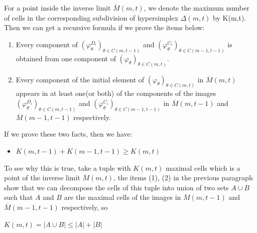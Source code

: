 \documentclass[12pt, reqno]{amsart}
\newtheorem{lemma}[theorem]{Lemma}
\theoremstyle{definition}
\theoremstyle{remark}
\numberwithin{equation}{section}
\begin{document}
  
  
  For 
  a  point inside the  inverse limit
  $\overline{M}(m,t)$,
   we denote the
  maximum number of cells in the corresponding  subdivision of hypersimplex
  $\Delta(m,t)$ by K(m,t). Then we can get a recursive formula if we prove the items below:
  
 
  \begin{enumerate}
  	\item 
  	Every component of 
  	 $(\varphi_{\theta}^{D_i})_{\theta\in C(m,t-1)}$
  	and
  	$(\varphi_{\theta}^{C_i})_{\theta\in C(m-1,t-1)}$ is obtained from one component of 
  	 $(\varphi_{\theta})_{\theta \in C(m,t)}$.
  	

  	\item 
  		Every  component of the 
  		initial element of
  		$(\varphi_{\theta})_{\theta \in C(m,t)}$
  		in $\overline{M}(m,t)$ appears in at least one(or both) of the components of the images
  		$(\varphi_{\theta}^{D_i})_{\theta\in C(m,t-1)}$
  		and
  		$(\varphi_{\theta}^{C_i})_{\theta\in C(m-1,t-1)}$
  		in
  	$\overline{M}(m,t-1)$ and 
  	$\overline{M}(m-1,t-1)$ respectively.
  \end{enumerate}

  If we prove these two facts, then we have:
  
  \begin{center}
  	
  	\begin{itemize}
  		\item 
  		$K(m,t-1)+K(m-1,t-1)\geq K(m,t)$
  		
  	\end{itemize}
  	  \end{center}
  	
  	To see why this is true, take a  tuple with 
  	$K(m,t)$ maximal cells
  	 which is  a point of the inverse limit
  	$\overline{M}(m,t)$, the items (1), (2) in the previous paragraph show that 
  	we can decompose the cells of this tuple into union of two sets $A\cup B$ such that $A$  and $B$ are the
  	maximal cells of the images in 
  	$\overline{M}(m,t-1)$
  	and
  	$\overline{M}(m-1,t-1)$
  	respectively, so
  	
  	\begin{center}
  		
  		$K(m,t)=|A\cup B|\leq |A|+|B|$
  	\end{center}
  	
\end{document}
